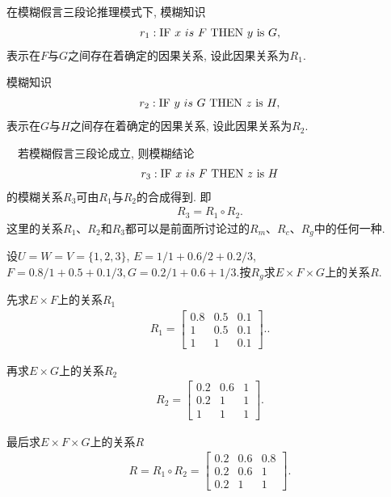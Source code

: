 在模糊假言三段论推理模式下, 模糊知识
\begin{align*}
    r_1:  \textup{IF}\,\,   x \,\, is \,\, F \,\, \textup{THEN}\,\,   y\,\,  \textup{is} \,\,G,
\end{align*}
表示在$F$与$G$之间存在着确定的因果关系, 设此因果关系为$R_1$.

模糊知识
\begin{align*}
   r_2:  \textup{IF}\,\,   y \,\, is \,\, G \,\, \textup{THEN}\,\,   z\,\,  \textup{is} \,\, H,
\end{align*}
表示在$G$与$H$之间存在着确定的因果关系, 设此因果关系为$R_2$.

　若模糊假言三段论成立, 则模糊结论
\begin{align*}
    r_3:  \textup{IF}\,\,   x \,\, is \,\, F \,\, \textup{THEN}\,\,   z\,\,  \textup{is} \,\, H
\end{align*}
的模糊关系$R_3$可由$R_1$与$R_2$的合成得到. 即
\begin{align*}
    R_3=R_1\circ R_2.
\end{align*}
这里的关系$R_1$、$R_2$和$R_3$都可以是前面所讨论过的$R_m$、$R_c$、$R_g$中的任何一种.

\begin{example}
  设$U=W=V=\{1, 2, 3\}$, $E=1/1+0.6/2+0.2/3$, $F=0.8/1+0.5+0.1/3, G=0.2/1+0.6+1/3$.按$R_g$求$E\times F\times G$上的关系$R$.
\end{example}
\begin{result}
    先求$E\times F$上的关系$R_1$
\begin{align*}
    R_{1}=\left[
    \begin{array}{ccc}
     {0.8} & {0.5} & {0.1} \\
     {1} & {0.5} & {0.1} \\
     {1} & {1} & {0.1}
    \end{array}
    \right]..
\end{align*}

再求$E\times G$上的关系$R_2$
\begin{align*}
    R_{2}=\left[
    \begin{array}{ccc}
        {0.2} & {0.6} & {1} \\ 
        {0.2} & {1} & {1} \\ 
        {1} & {1} & {1}
    \end{array}\right].
\end{align*}

最后求$E\times F\times G$上的关系$R$
\begin{align*}
    R=R_{1} \circ R_{2}=\left[
    \begin{array}{ccc}
        {0.2} & {0.6} & {0.8} \\ {0.2} & {0.6} & {1} \\ {0.2} & {1} & {1}
    \end{array}\right].
\end{align*}
\end{result}
